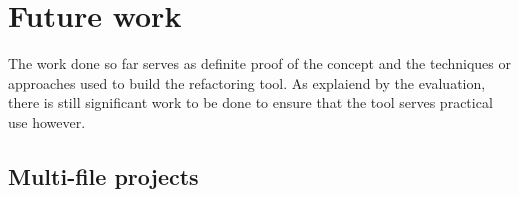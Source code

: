 \chapter{Future work}\label{C:future}
The work done so far serves as definite proof of the concept and the techniques or approaches used to build the refactoring tool. As explaiend by the evaluation, there is still significant work to be done to ensure that the tool serves practical use however.



\section{Multi-file projects}



